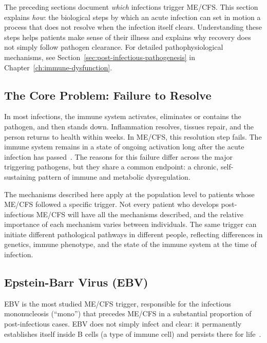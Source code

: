 
The preceding sections document \textit{which} infections trigger ME/CFS. This section explains \textit{how}: the biological steps by which an acute infection can set in motion a process that does not resolve when the infection itself clears. Understanding these steps helps patients make sense of their illness and explains why recovery does not simply follow pathogen clearance. For detailed pathophysiological mechanisms, see Section~\ref{sec:post-infectious-pathogenesis} in Chapter~\ref{ch:immune-dysfunction}.

\subsection{The Core Problem: Failure to Resolve}

In most infections, the immune system activates, eliminates or contains the pathogen, and then stands down. Inflammation resolves, tissues repair, and the person returns to health within weeks. In ME/CFS, this resolution step fails. The immune system remains in a state of ongoing activation long after the acute infection has passed~\cite{Rasa2018}. The reasons for this failure differ across the major triggering pathogens, but they share a common endpoint: a chronic, self-sustaining pattern of immune and metabolic dysregulation.

\begin{warning}
\label{warn:trigger-variation}
The mechanisms described here apply at the population level to patients whose ME/CFS followed a specific trigger. Not every patient who develops post-infectious ME/CFS will have all the mechanisms described, and the relative importance of each mechanism varies between individuals. The same trigger can initiate different pathological pathways in different people, reflecting differences in genetics, immune phenotype, and the state of the immune system at the time of infection.
\end{warning}

\subsection{Epstein-Barr Virus (EBV)}

EBV is the most studied ME/CFS trigger, responsible for the infectious mononucleosis (``mono'') that precedes ME/CFS in a substantial proportion of post-infectious cases. EBV does not simply infect and clear: it permanently establishes itself inside B cells (a type of immune cell) and persists there for life~\cite{Rasa2018}.

